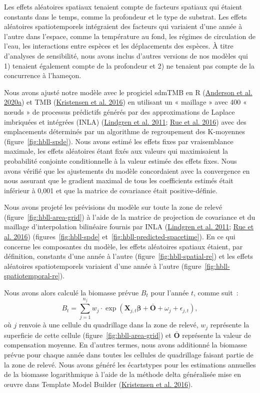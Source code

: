 \documentclass[french,11pt]{book}
\begin{document}
Les effets aléatoires spatiaux tenaient compte de facteurs spatiaux qui étaient constants dans le temps, comme la profondeur et le type de substrat. Les effets aléatoires spatiotemporels intégraient des facteurs qui variaient d'une année à l'autre dans l'espace, comme la température au fond, les régimes de circulation de l'eau, les interactions entre espèces et les déplacements des espèces. À titre d'analyses de sensibilité, nous avons inclus d'autres versions de nos modèles qui 1) tenaient également compte de la profondeur et 2) ne tenaient pas compte de la concurrence à l'hameçon.

Nous avons ajusté notre modèle avec le progiciel sdmTMB en R (\protect\hyperlink{ref-sdmtmb}{Anderson et al. 2020a}) et TMB (\protect\hyperlink{ref-tmb}{Kristensen et al. 2016}) en utilisant un « maillage » avec 400 « nœuds » de processus prédictifs générés par des approximations de Laplace imbriquées et intégrées (INLA) (\protect\hyperlink{ref-lindgren2011}{Lindgren et al. 2011}; \protect\hyperlink{ref-rue2016}{Rue et al. 2016}) avec des emplacements déterminés par un algorithme de regroupement des K-moyennes (figure~\ref{fig:hbll-spde}). Nous avons estimé les effets fixes par vraisemblance maximale, les effets aléatoires étant fixés aux valeurs qui maximisaient la probabilité conjointe conditionnelle à la valeur estimée des effets fixes. Nous avons vérifié que les ajustements du modèle concordaient avec la convergence en nous assurant que le gradient maximal de tous les coefficients estimés était inférieur à 0,001 et que la matrice de covariance était positive-définie.

Nous avons projeté les prévisions du modèle sur toute la zone de relevé (figure~\ref{fig:hbll-area-grid}) à l'aide de la matrice de projection de covariance et du maillage d'interpolation bilinéaire fournis par INLA (\protect\hyperlink{ref-lindgren2011}{Lindgren et al. 2011}; \protect\hyperlink{ref-rue2016}{Rue et al. 2016}) (figures~\ref{fig:hbll-spde} et~\ref{fig:hbll-predicted-spacetime}). En ce qui concerne les composantes du modèle, les effets aléatoires spatiaux étaient, par définition, constants d'une année à l'autre (figure~\ref{fig:hbll-spatial-re}) et les effets aléatoires spatiotemporels variaient d'une année à l'autre (figure~\ref{fig:hbll-spatiotemporal-re}).

Nous avons alors calculé la biomasse prévue \(B_t\) pour l'année \(t\), comme suit~:
\begin{equation}
B_t = \sum_{j = 1}^{n_j}
  w_j \cdot \exp \left( \bm{X}_{j,t} \bm{\beta} + \bar{\bm{O}} + \omega_j + \epsilon_{j,t} \right),
\end{equation}
où \(j\) renvoie à une cellule du quadrillage dans la zone de relevé, \(w_j\) représente la superficie de cette cellule (figure~\ref{fig:hbll-area-grid}) et \(\bar{\bm{O}}\) représente la valeur de compensation moyenne. En d'autres termes, nous avons additionné la biomasse prévue pour chaque année dans toutes les cellules de quadrillage faisant partie de la zone de relevé. Nous avons généré les écarts­types pour les estimations annuelles de la biomasse logarithmique à l'aide de la méthode delta généralisée mise en œuvre dans Template Model Builder (\protect\hyperlink{ref-tmb}{Kristensen et al. 2016}).
\end{document}

